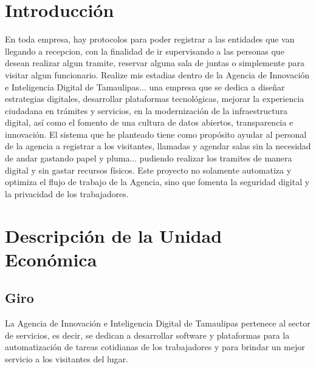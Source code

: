 \documentclass[12pt]{article}
\begin{document}
\clearpage

\thispagestyle{empty}
\ClearWallPaper
\tableofcontents



\clearpage
{}
\setcounter{page}{1}
\pagestyle{fancy}

\section{Introducción}
En toda empresa, hay protocolos para poder registrar a las entidades que van llegando a recepcion, con la finalidad de ir supervisando a las personas que desean realizar algun tramite, reservar alguna sala de juntas o simplemente para visitar algun funcionario. Realize mis estadias dentro de la Agencia de Innovación e Inteligencia Digital de Tamaulipas... una empresa que se dedica a diseñar estrategias digitales, desarrollar plataformas tecnológicas, mejorar la experiencia ciudadana en trámites y servicios, en la modernización de la infraestructura digital, así como el fomento de una cultura de datos abiertos, transparencia e innovación. El sistema que he planteado tiene como propósito ayudar al personal de la agencia a registrar a los visitantes, llamadas y agendar salas sin la necesidad de andar gastando papel y pluma... pudiendo realizar los tramites de manera digital y sin gastar recursos físicos. Este proyecto no solamente automatiza y optimiza el flujo de trabajo de la Agencia, sino que fomenta la seguridad digital y la privacidad de los trabajadores.




\clearpage
\section{Descripción de la Unidad Económica}

\subsection{Giro}
La Agencia de Innovación e Inteligencia Digital de Tamaulipas pertenece al sector de servicios, es decir, se dedican a desarrollar software y plataformas para la automatización de tareas cotidianas de los trabajadores y para brindar un mejor servicio a los visitantes del lugar.
\end{document}
